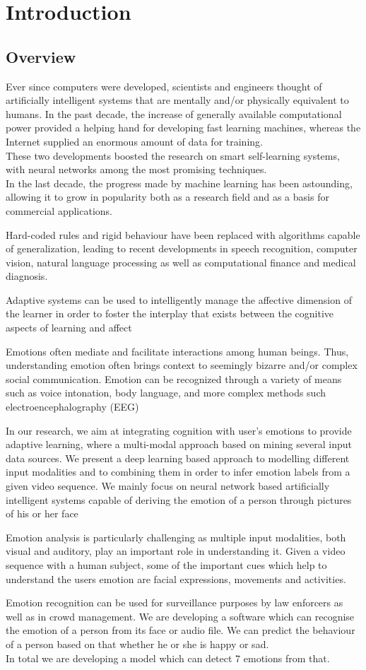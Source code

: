 \chapter{Introduction}
\section{Overview}
Ever since computers were developed, scientists and engineers thought of artificially intelligent systems that are mentally and/or physically equivalent to humans. In the past decade, the increase of generally available computational power provided a helping hand for developing fast learning machines, whereas the Internet supplied an enormous amount of data for training.\\ 
These two developments boosted the research on smart self-learning systems, with neural networks among the most promising techniques.\\
In the last decade, the progress made by machine learning has been astounding, allowing it to grow in popularity both as a research field and as a basis for commercial applications.

Hard-coded rules and rigid behaviour have been replaced with algorithms capable of generalization, leading to recent developments in speech recognition, computer vision, natural language processing as well as computational finance and medical diagnosis.

Adaptive systems can be used to intelligently manage the affective dimension of the learner in order to foster the interplay that exists between the cognitive aspects of learning and affect

Emotions often mediate and facilitate interactions among human beings. Thus, understanding emotion often brings context to seemingly bizarre and/or complex social communication. Emotion can be recognized through a variety of means such as voice intonation, body language, and more complex methods such electroencephalography (EEG)

In our research,  we aim at integrating cognition with user’s emotions to provide adaptive learning, where a multi-modal approach based on mining several input data sources. We present a deep learning based approach to modelling different input modalities and to combining them in order to infer emotion labels from a given video sequence. We mainly focus on neural network based artificially intelligent systems capable of deriving the emotion of a person through pictures of his or her face

Emotion analysis is particularly challenging as multiple input modalities, both visual and auditory, play an important role in understanding it. Given a video sequence with a human subject, some of the important cues which help to understand the users emotion are facial expressions, movements and activities.

Emotion recognition can be used for surveillance purposes by law enforcers as well as in crowd management. We are developing a software which can recognise the emotion of a person from its face or audio file. We can predict the behaviour of a person based on that whether he or she is happy or sad.\\
In total we are developing a model which can detect 7 emotions from that.
 